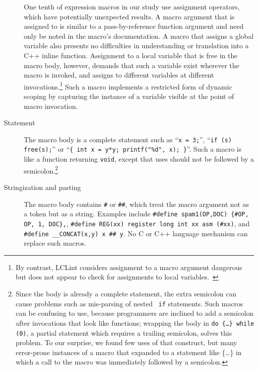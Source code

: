 \documentclass[11pt]{article}
\begin{document}
\begin{description}
One tenth of expression macros in our study use assignment operators, which
have potentially unexpected results.  A macro argument that is assigned to
is similar to a pass-by-reference function argument and need only be noted in the
macro's documentation.  A macro that assigns a global variable also
presents no difficulties in understanding or translation into a C++
inline function.
Assignment to a local variable that is free in the macro body, however,
demands that such a variable exist wherever the macro is invoked, and
assigns to different variables at different invocations.\footnote{By
  contrast, LCLint considers assignment to a macro argument dangerous but
  does not appear to check for assignments to local
  variables.~\cite{Evans:LCLint}} Such a macro implements a restricted form
of dynamic scoping by capturing the instance of a variable visible at
the point of macro invocation.


\item[Statement]  The macro body is a complete statement such as
  ``{\tt x = 3;}'', ``{\tt if (s) free(s);}'' or ``{\tt \verb|{| int x =
    y*y; printf("\%d", x); \verb|}|}''.  Such a macro is like a function
    returning {\tt void}, except that uses should not be followed by a
    semicolon.\footnote{Since the body is already a complete statement, the
      extra semicolon can cause problems such as mis-parsing of nested {\tt
      if} statements.  Such macros can be confusing to use, because
    programmers are inclined to add a semicolon after invocations that look
    like functions; wrapping the body in {\tt do \{\ldots\} while (0)}, a
    partial statement which requires a trailing semicolon, solves this
    problem.  To our surprise, we found few uses of that construct, but
    many error-prone instances of a macro that expanded to a statement like
    \{\ldots\} in which a call to the macro was immediately followed by a
    semicolon.}

\item[Stringization and pasting]  The macro body contains {\tt \#} or
  {\tt \#\#}, which treat the macro argument not as a token but as a
  string.  Examples include {\tt \#define spam1(OP,DOC) \verb|{|\#OP, OP,
    1, DOC\verb|}|,}, {\tt \#define REG(xx) register long int xx asm
    (\#xx)}, and {\tt \#define \verb|__CONCAT|(x,y) x \#\# y}.  No C or C++
  language mechanism can replace such macros.


\end{description}
\end{document}
